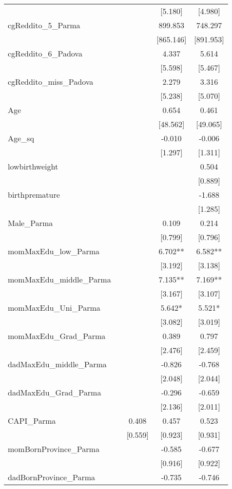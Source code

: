 \documentclass[]{article}
\begin{document}
\begin{tabular}{lcccc}
 &  &  & [5.180] & [4.980] \\
cgReddito\_5\_Parma &  &  & 899.853 & 748.297 \\
 &  &  & [865.146] & [891.953] \\
cgReddito\_6\_Padova &  &  & 4.337 & 5.614 \\
 &  &  & [5.598] & [5.467] \\
cgReddito\_miss\_Padova &  &  & 2.279 & 3.316 \\
 &  &  & [5.238] & [5.070] \\
Age &  &  & 0.654 & 0.461 \\
 &  &  & [48.562] & [49.065] \\
Age\_sq &  &  & -0.010 & -0.006 \\
 &  &  & [1.297] & [1.311] \\
lowbirthweight &  &  &  & 0.504 \\
 &  &  &  & [0.889] \\
birthpremature &  &  &  & -1.688 \\
 &  &  &  & [1.285] \\
Male\_Parma &  &  & 0.109 & 0.214 \\
 &  &  & [0.799] & [0.796] \\
momMaxEdu\_low\_Parma &  &  & 6.702** & 6.582** \\
 &  &  & [3.192] & [3.138] \\
momMaxEdu\_middle\_Parma &  &  & 7.135** & 7.169** \\
 &  &  & [3.167] & [3.107] \\
momMaxEdu\_Uni\_Parma &  &  & 5.642* & 5.521* \\
 &  &  & [3.082] & [3.019] \\
momMaxEdu\_Grad\_Parma &  &  & 0.389 & 0.797 \\
 &  &  & [2.476] & [2.459] \\
dadMaxEdu\_middle\_Parma &  &  & -0.826 & -0.768 \\
 &  &  & [2.048] & [2.044] \\
dadMaxEdu\_Grad\_Parma &  &  & -0.296 & -0.659 \\
 &  &  & [2.136] & [2.011] \\
CAPI\_Parma &  & 0.408 & 0.457 & 0.523 \\
 &  & [0.559] & [0.923] & [0.931] \\
momBornProvince\_Parma &  &  & -0.585 & -0.677 \\
 &  &  & [0.916] & [0.922] \\
dadBornProvince\_Parma &  &  & -0.735 & -0.746 \\

\end{tabular}
\end{document}
